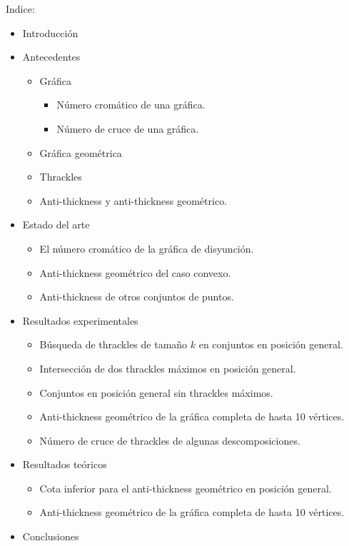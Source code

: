\documentclass[12pt, letterpaper]{article}
\begin{document}
Indice:
\begin{itemize}
  \item Introducción
  \item Antecedentes
    \begin{itemize}
      \item Gráfica
      \begin{itemize}
        \item Número cromático de una gráfica.
        \item Número de cruce de una gráfica.
      \end{itemize}
      \item Gráfica geométrica
      \item Thrackles
      \item Anti-thickness y anti-thickness geométrico.
    \end{itemize}
  \item Estado del arte
    \begin{itemize}
      \item El número cromático de la gráfica de disyunción.
      \item Anti-thickness geométrico del caso convexo.
      \item Anti-thickness de otros conjuntos de puntos.
    \end{itemize}
  \item Resultados experimentales
    \begin{itemize}
      \item Búsqueda de thrackles de tamaño $k$ en conjuntos en posición general.
      \item Intersección de dos thrackles máximos en posición general.
      \item Conjuntos en posición general sin thrackles máximos.
      \item Anti-thickness geométrico de la gráfica completa de hasta 10 vértices.
      \item Número de cruce de thrackles de algunas descomposiciones.
    \end{itemize}
  \item Resultados teóricos
    \begin{itemize}
      \item Cota inferior para el anti-thickness geométrico en posición general.
      \item Anti-thickness geométrico de la gráfica completa de hasta 10 vértices.
    \end{itemize}
  \item Conclusiones
\end{itemize}
\end{document}
